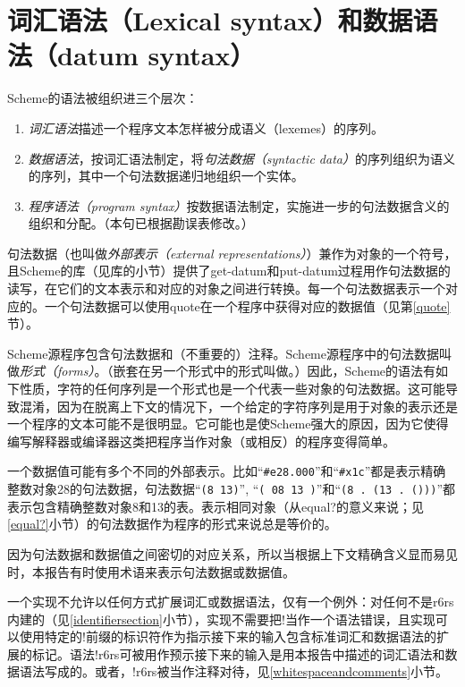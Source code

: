 \chapter{词汇语法（Lexical syntax）和数据语法（datum syntax）}
\label{readsyntaxchapter}

Scheme的语法被组织进三个层次：
%
\begin{enumerate}
\item \textit{词汇语法}描述一个程序文本怎样被分成语义（lexemes）的序列。
\item \textit{数据语法}，按词汇语法制定，将\textit{句法数据（syntactic data）}的序列组织为语义的序列，其中一个句法数据递归地组织一个实体。
\item \textit{程序语法（program syntax）}按数据语法制定，实施进一步的句法数据含义的组织和分配。（本句已根据勘误表修改。）
\end{enumerate}
%
句法数据（也叫做\textit{外部表示（external representations）}）兼作为对象的一个符号，且Scheme的库（见库的小节）提供了{\cf get-datum}和{\cf put-datum}过程用作句法数据的读写，在它们的文本表示和对应的对象之间进行转换。每一个句法数据表示一个对应的。一个句法数据可以使用{\cf quote}在一个程序中获得对应的数据值（见第\ref{quote}节）。

Scheme源程序包含句法数据和（不重要的）注释。Scheme源程序中的句法数据叫做\textit{形式（forms）}。（嵌套在另一个形式中的形式叫做。）因此，Scheme的语法有如下性质，字符的任何序列是一个形式也是一个代表一些对象的句法数据。这可能导致混淆，因为在脱离上下文的情况下，一个给定的字符序列是用于对象的表示还是一个程序的文本可能不是很明显。它可能也是使Scheme强大的原因，因为它使得编写解释器或编译器这类把程序当作对象（或相反）的程序变得简单。

一个数据值可能有多个不同的外部表示。比如“{\tt \#e28.000}”和“{\tt\#x1c}”都是表示精确整数对象28的句法数据，句法数据“{\tt(8 13)}”, “{\tt( 08 13 )}”和“{\tt(8 .\ (13 .\ ()))}”都表示包含精确整数对象8和13的表。表示相同对象（从{\cf equal?}的意义来说；见\ref{equal?}小节）的句法数据作为程序的形式来说总是等价的。

因为句法数据和数据值之间密切的对应关系，所以当根据上下文精确含义显而易见时，本报告有时使用术语来表示句法数据或数据值。

一个实现不允许以任何方式扩展词汇或数据语法，仅有一个例外：对任何不是{\cf r6rs}内建的（见\ref{identifiersection}小节），实现不需要把{\cf \sharpsign{}!}当作一个语法错误，且实现可以使用特定的{\cf \sharpsign{}!}前缀的标识符作为指示接下来的输入包含标准词汇和数据语法的扩展的标记。语法{\cf \sharpsign{}!r6rs}可被用作预示接下来的输入是用本报告中描述的词汇语法和数据语法写成的。或者，{\cf \sharpsign{}!r6rs}被当作注释对待，见\ref{whitespaceandcomments}小节。

